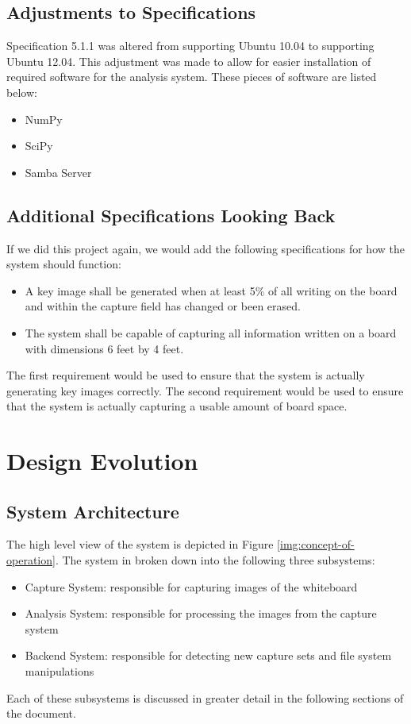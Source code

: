 \documentclass[]{article}
\begin{document}
		\subsection{Adjustments to Specifications}
			Specification 5.1.1 was altered from supporting Ubuntu 10.04 to supporting Ubuntu 12.04. This adjustment was made to allow for easier installation of required software for the analysis system. These pieces of software are listed below:
			\begin{itemize}
				\item NumPy
				\item SciPy
				\item Samba Server
			\end{itemize}
			
		\subsection{Additional Specifications Looking Back}
			If we did this project again, we would add the following specifications for how the system should function:
			\begin{itemize}
				\item A key image shall be generated when at least 5\% of all writing on the board and within the capture field has changed or been erased.
				\item The system shall be capable of capturing all information written on a board with dimensions 6 feet by 4 feet.
			\end{itemize}
			The first requirement would be used to ensure that the system is actually generating key images correctly. The second requirement would be used to ensure that the system is actually capturing a usable amount of board space.
					
	\section{Design Evolution}
		
		\subsection{System Architecture}
		
		
			The high level view of the system is depicted in Figure \ref{img:concept-of-operation}. The system in broken down into the following three subsystems:
			\begin{itemize}
				\item Capture System: responsible for capturing images of the whiteboard
				\item Analysis System: responsible for processing the images from the capture system
				\item Backend System: responsible for detecting new capture sets and file system manipulations
			\end{itemize}
			\noindent
			Each of these subsystems is discussed in greater detail in the following sections of the document. 
			
\end{document}
